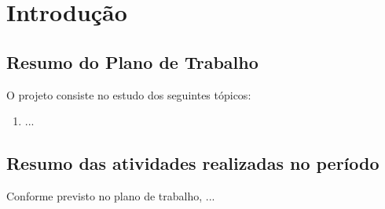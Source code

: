 \section{Introdução}

\subsection{Resumo do Plano de Trabalho}
O projeto consiste no estudo dos seguintes tópicos:
\begin{enumerate}
    \item ...
\end{enumerate}

\subsection{Resumo das atividades realizadas no período}

Conforme previsto no plano de trabalho, ...